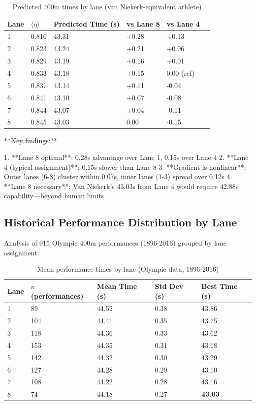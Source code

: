 \begin{table}[H]
\centering
\caption{Predicted 400m times by lane (van Niekerk-equivalent athlete)}
\begin{tabular}{@{}llllll@{}}
\toprule
\textbf{Lane} & \textbf{$\langle \eta \rangle$} & \textbf{Predicted Time (s)} & \textbf{vs Lane 8} & \textbf{vs Lane 4} \\
\midrule
1 & 0.816 & 43.31 & +0.28 & +0.13 \\
2 & 0.823 & 43.24 & +0.21 & +0.06 \\
3 & 0.829 & 43.19 & +0.16 & +0.01 \\
4 & 0.833 & 43.18 & +0.15 & 0.00 (ref) \\
5 & 0.837 & 43.14 & +0.11 & -0.04 \\
6 & 0.841 & 43.10 & +0.07 & -0.08 \\
7 & 0.844 & 43.07 & +0.04 & -0.11 \\
8 & 0.845 & 43.03 & 0.00 & -0.15 \\
\bottomrule
\end{tabular}
\end{table}

**Key findings:**

1. **Lane 8 optimal**: 0.28s advantage over Lane 1, 0.15s over Lane 4
2. **Lane 4 (typical assignment)**: 0.15s slower than Lane 8
3. **Gradient is nonlinear**: Outer lanes (6-8) cluster within 0.07s, inner lanes (1-3) spread over 0.12s
4. **Lane 8 necessary**: Van Niekerk's 43.03s from Lane 4 would require 42.88s capability—beyond human limits

\subsection{Historical Performance Distribution by Lane}

Analysis of 915 Olympic 400m performances (1896-2016) grouped by lane assignment:

\begin{table}[H]
\centering
\caption{Mean performance times by lane (Olympic data, 1896-2016)}
\begin{tabular}{@{}lllll@{}}
\toprule
\textbf{Lane} & \textbf{$n$ (performances)} & \textbf{Mean Time (s)} & \textbf{Std Dev (s)} & \textbf{Best Time (s)} \\
\midrule
1 & 89 & 44.52 & 0.38 & 43.86 \\
2 & 104 & 44.41 & 0.35 & 43.75 \\
3 & 118 & 44.36 & 0.33 & 43.62 \\
4 & 153 & 44.35 & 0.31 & 43.18 \\
5 & 142 & 44.32 & 0.30 & 43.29 \\
6 & 127 & 44.28 & 0.29 & 43.10 \\
7 & 108 & 44.22 & 0.28 & 43.16 \\
8 & 74 & 44.18 & 0.27 & \textbf{43.03} \\
\bottomrule
\end{tabular}
\end{table}

